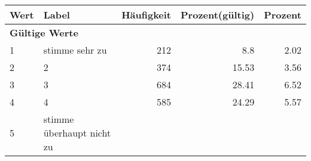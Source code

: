      \begin{longtable}{lXrrr}
     \toprule
     \textbf{Wert} & \textbf{Label} & \textbf{Häufigkeit} & \textbf{Prozent(gültig)} & \textbf{Prozent} \\
     \endhead
     \midrule
     \multicolumn{5}{l}{\textbf{Gültige Werte}}\\

     1 &
     \multicolumn{1}{X}{ stimme sehr zu   } &


       \num{212} &
       \num[round-mode=places,round-precision=2]{8,8} &
         \num[round-mode=places,round-precision=2]{2,02} \\

     2 &
     \multicolumn{1}{X}{ 2   } &


       \num{374} &
       \num[round-mode=places,round-precision=2]{15,53} &
         \num[round-mode=places,round-precision=2]{3,56} \\

     3 &
     \multicolumn{1}{X}{ 3   } &


       \num{684} &
       \num[round-mode=places,round-precision=2]{28,41} &
         \num[round-mode=places,round-precision=2]{6,52} \\

     4 &
     \multicolumn{1}{X}{ 4   } &


       \num{585} &
       \num[round-mode=places,round-precision=2]{24,29} &
         \num[round-mode=places,round-precision=2]{5,57} \\

     5 &
     \multicolumn{1}{X}{ stimme überhaupt nicht zu   } &



\end{longtable}
